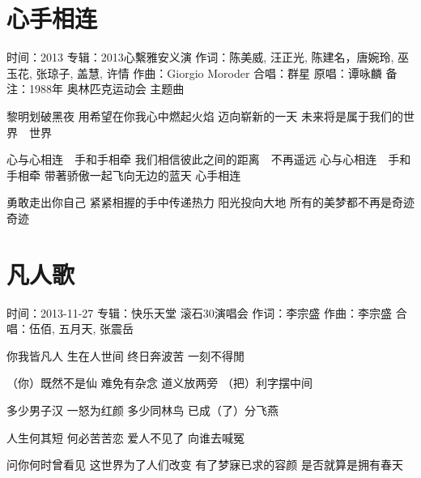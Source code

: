 \documentclass[UTF8,a4paper,oneside,twocolumn,12pt]{ctexbook}
\newcommand{\infopair}[2]{\textbullet #1：#2}
\newcommand{\zc}[1][伍佰]{\infopair{作词}{#1}}
\newcommand{\zq}[1][伍佰]{\infopair{作曲}{#1}}
\newcommand{\zj}[1]{\infopair{专辑}{#1}}
\newcommand{\yc}[1]{\infopair{原唱}{#1}}
\newcommand{\sj}[1]{\infopair{时间}{#1}}
\newcommand{\bz}[1]{\infopair{备注}{#1}}
\newenvironment{info}{\begin{flushleft}\kaishu
	}
	{\end{flushleft}\normalsize\yahei\par}
\newenvironment{lyric}{
	}
{}
\begin{document}
\section{心手相连}
\begin{info}
	\sj{2013}
	\zj{2013心繫雅安义演}
	\zc[陈美威, 汪正光, 陈建名，唐婉玲, 巫玉花, 张琼子, 盖慧, 许情]
	\zq[Giorgio Moroder]
	\infopair{合唱}{群星}
	\yc{谭咏麟}
	\bz{1988年 奥林匹克运动会 主题曲}
\end{info}
\begin{lyric}
	黎明划破黑夜
	用希望在你我心中燃起火焰
	迈向崭新的一天
	未来将是属于我们的世界　世界

	心与心相连　手和手相牵
	我们相信彼此之间的距离　不再遥远
	心与心相连　手和手相牵
	带著骄傲一起飞向无边的蓝天
	心手相连

	勇敢走出你自己
	紧紧相握的手中传递热力
	阳光投向大地
	所有的美梦都不再是奇迹　奇迹
\end{lyric}

\section{凡人歌}
\begin{info}
	\sj{2013-11-27}
	\zj{快乐天堂 滚石30演唱会}
	\zc[李宗盛]
	\zq[李宗盛]
	\infopair{合唱}{伍佰, 五月天, 张震岳}
\end{info}
\begin{lyric}
	你我皆凡人  生在人世间
	终日奔波苦  一刻不得閒

	（你）既然不是仙  难免有杂念
	道义放两旁  （把）利字摆中间

	多少男子汉  一怒为红颜
	多少同林鸟  已成（了）分飞燕

	人生何其短  何必苦苦恋
	爱人不见了  向谁去喊冤

	问你何时曾看见  这世界为了人们改变
	有了梦寐已求的容颜  是否就算是拥有春天
\end{lyric}
\end{document}
